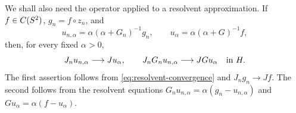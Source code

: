 We shall also need the operator applied to a resolvent approximation. If
$f\in C(S^2)$, $g_n=f\circ z_n$, and
\begin{equation}\label{eq:resolvent-functions}
 u_{n,\alpha}=\alpha(\alpha+G_n)^{-1}g_n,
 \qquad u_\alpha=\alpha(\alpha+G)^{-1}f,
\end{equation}
then, for every fixed $\alpha>0$,
\begin{equation}\label{eq:resolvent-graph-convergence}
 J_nu_{n,\alpha}\longrightarrow Ju_\alpha,
 \qquad J_nG_nu_{n,\alpha}\longrightarrow JGu_\alpha
 \quad\hbox{in }H.
\end{equation}
The first assertion follows from \eqref{eq:resolvent-convergence} and
$J_ng_n\to Jf$. The second follows from the resolvent equations
$G_nu_{n,\alpha}=\alpha(g_n-u_{n,\alpha})$ and
$Gu_\alpha=\alpha(f-u_\alpha)$.
